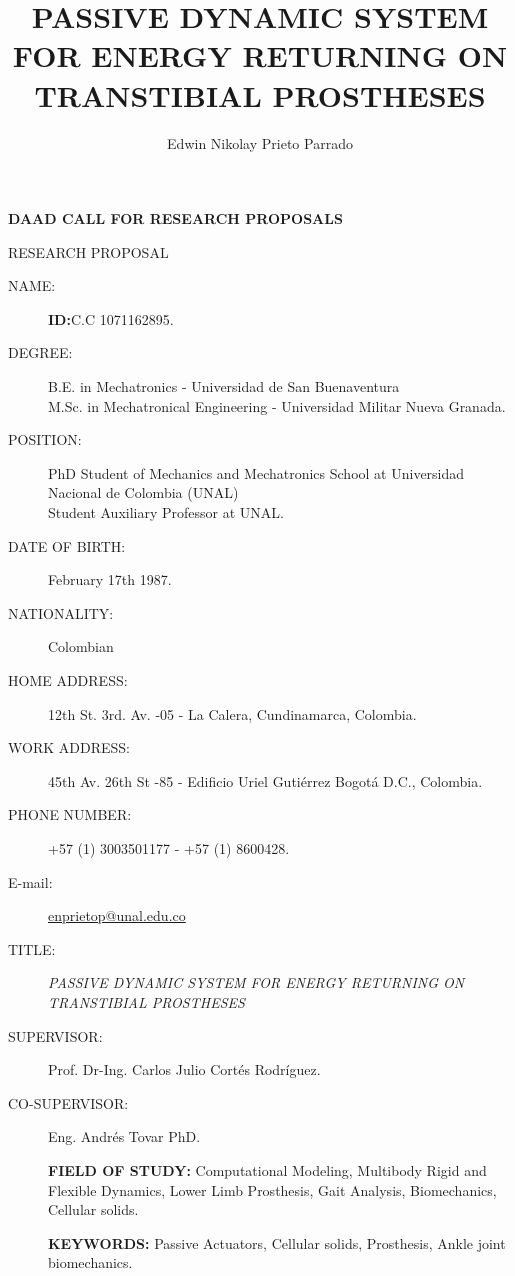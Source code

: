 \documentclass[12pt,english]{article}
\begin{document}
\title{PASSIVE DYNAMIC SYSTEM FOR ENERGY RETURNING ON TRANSTIBIAL PROSTHESES}
\maketitle
\begin{center}
 \textbf{{\large DAAD CALL FOR RESEARCH PROPOSALS}}
\par\end{center}

\begin{center}
RESEARCH PROPOSAL 
\par\end{center}

\begin{description}
\item [{NAME:}] \author{Edwin Nikolay Prieto Parrado} \textbf{ID:}C.C 1071162895.
\item [{DEGREE:}] B.E. in Mechatronics - Universidad de San Buenaventura \\ M.Sc. in Mechatronical Engineering - Universidad Militar Nueva Granada.
\item[{POSITION: }] PhD Student of Mechanics and Mechatronics School at Universidad Nacional de Colombia (UNAL) \\ Student Auxiliary Professor at UNAL.
\item[{DATE OF BIRTH: }] February 17th 1987.
\item[{NATIONALITY: }] Colombian
\item[{HOME ADDRESS: }] 12th St. 3rd. Av. -05 - La Calera, Cundinamarca, Colombia.
\item[{WORK ADDRESS: }] 45th Av. 26th St -85 - Edificio Uriel Gutiérrez
Bogotá D.C.,  Colombia.
\item[{PHONE NUMBER: }] +57 (1) 3003501177 - +57 (1) 8600428.
\item[{E-mail: }] \href{mailto:enprietop@unal.edu.co}{  enprietop@unal.edu.co}
\item[{TITLE: }]\emph{{\large PASSIVE DYNAMIC SYSTEM FOR ENERGY RETURNING ON TRANSTIBIAL PROSTHESES}}


\item [{SUPERVISOR:}] Prof. Dr-Ing. Carlos Julio Cortés
Rodríguez.
\item [{CO-SUPERVISOR:}] Eng. Andrés Tovar PhD.

 \textbf{FIELD OF STUDY:} Computational Modeling, Multibody Rigid and Flexible Dynamics, Lower Limb Prosthesis, Gait Analysis, Biomechanics, Cellular solids.

\textbf{KEYWORDS:} Passive Actuators, Cellular solids, Prosthesis, Ankle joint biomechanics.


\end{description}
\newpage
\renewcommand*\contentsname{Summary}
\tableofcontents
\newpage
\end{document}
